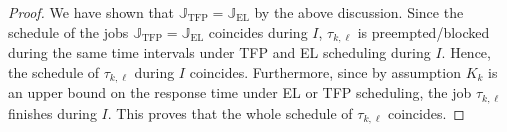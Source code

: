 \documentclass[conference]{IEEEtran}
\theoremstyle{definition}
\theoremstyle{remark}
\newcommand{\mario}[1]{{\color{red}mg: #1}}
\newcommand{\Jbb}{\mathbb{J}}
\DeclareMathOperator{\TFP}{TFP}
\DeclareMathOperator{\EL}{EL}
\begin{document}
\begin{proof}
	We have shown that $\Jbb_{\TFP}=\Jbb_{\EL}$ by the above discussion.
	Since the schedule of the jobs $\Jbb_{\TFP}=\Jbb_{\EL}$ coincides during $I$, $\tau_{k,\ell}$ is preempted/blocked during the same time intervals under TFP and EL scheduling during $I$.
	Hence, the schedule of $\tau_{k,\ell}$ during $I$ coincides.
	Furthermore, since by assumption $K_k$ is an upper bound on the response time under EL or TFP scheduling, the job $\tau_{k,\ell}$ finishes during $I$.
	This proves that the whole schedule of $\tau_{k,\ell}$ coincides.
%	
%	

\end{proof}
\end{document}
